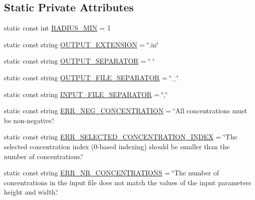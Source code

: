 \subsection*{Static Private Attributes}
\begin{DoxyCompactItemize}
\item 
static const int \hyperlink{classmultiscale_1_1video_1_1PolarCsvToInputFilesConverter_aeb8eeef6a83cd99ebfc47053a1ec99a7}{R\-A\-D\-I\-U\-S\-\_\-\-M\-I\-N} = 1
\item 
static const string \hyperlink{classmultiscale_1_1video_1_1PolarCsvToInputFilesConverter_a56aba7dfbcf26587bd62f33549f2ff9d}{O\-U\-T\-P\-U\-T\-\_\-\-E\-X\-T\-E\-N\-S\-I\-O\-N} = \char`\"{}.in\char`\"{}
\item 
static const string \hyperlink{classmultiscale_1_1video_1_1PolarCsvToInputFilesConverter_ad447c289e9cede69b3726cf21bfd9170}{O\-U\-T\-P\-U\-T\-\_\-\-S\-E\-P\-A\-R\-A\-T\-O\-R} = \char`\"{} \char`\"{}
\item 
static const string \hyperlink{classmultiscale_1_1video_1_1PolarCsvToInputFilesConverter_ad0594e8ac5379831ae98da51f099fe20}{O\-U\-T\-P\-U\-T\-\_\-\-F\-I\-L\-E\-\_\-\-S\-E\-P\-A\-R\-A\-T\-O\-R} = \char`\"{}\-\_\-\char`\"{}
\item 
static const string \hyperlink{classmultiscale_1_1video_1_1PolarCsvToInputFilesConverter_a50776983508e07e012e8af56f5432791}{I\-N\-P\-U\-T\-\_\-\-F\-I\-L\-E\-\_\-\-S\-E\-P\-A\-R\-A\-T\-O\-R} = \char`\"{},\char`\"{}
\item 
static const string \hyperlink{classmultiscale_1_1video_1_1PolarCsvToInputFilesConverter_a8d373be02d579bb5d2408f3a3bbd198a}{E\-R\-R\-\_\-\-N\-E\-G\-\_\-\-C\-O\-N\-C\-E\-N\-T\-R\-A\-T\-I\-O\-N} = \char`\"{}All concentrations must be non-\/negative.\char`\"{}
\item 
static const string \hyperlink{classmultiscale_1_1video_1_1PolarCsvToInputFilesConverter_abfe6222398ec34130ed689d190f85ea6}{E\-R\-R\-\_\-\-S\-E\-L\-E\-C\-T\-E\-D\-\_\-\-C\-O\-N\-C\-E\-N\-T\-R\-A\-T\-I\-O\-N\-\_\-\-I\-N\-D\-E\-X} = \char`\"{}The selected concentration index (0-\/based indexing) should be smaller than the number of concentrations.\char`\"{}
\item 
static const string \hyperlink{classmultiscale_1_1video_1_1PolarCsvToInputFilesConverter_a9b671949301bdb73d0b232be0b29c23e}{E\-R\-R\-\_\-\-N\-R\-\_\-\-C\-O\-N\-C\-E\-N\-T\-R\-A\-T\-I\-O\-N\-S} = \char`\"{}The number of concentrations in the input file does not match the values of the input parameters height and width.\char`\"{}
\item 

\end{DoxyCompactItemize}
